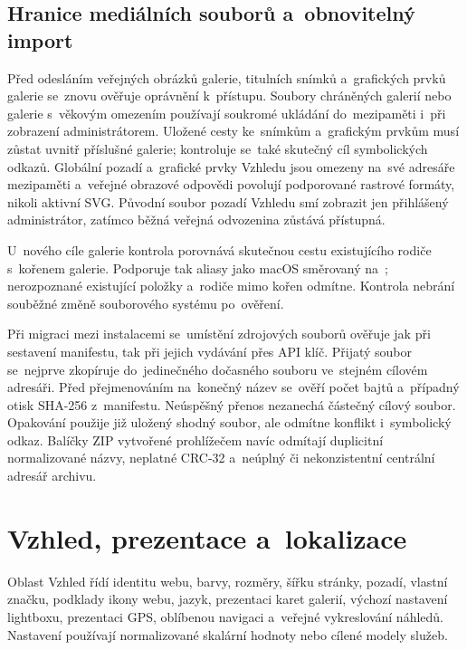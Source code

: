 \documentclass[11pt,a4paper]{article}
\newcommand{\filepath}[1]{\path{#1}}
\begin{document}
\subsection{Hranice mediálních souborů a~obnovitelný import}

Před odesláním veřejných obrázků galerie, titulních snímků a~grafických prvků
galerie se~znovu ověřuje oprávnění k~přístupu. Soubory chráněných galerií nebo
galerie s~věkovým omezením používají soukromé ukládání do~mezipaměti i~při
zobrazení administrátorem. Uložené cesty ke~snímkům a~grafickým prvkům musí
zůstat uvnitř příslušné galerie; kontroluje se~také skutečný cíl symbolických
odkazů. Globální pozadí a~grafické prvky Vzhledu jsou omezeny na~své adresáře
mezipaměti a~veřejné obrazové odpovědi povolují podporované rastrové formáty,
nikoli aktivní SVG. Původní soubor pozadí Vzhledu smí zobrazit jen přihlášený
administrátor, zatímco běžná veřejná odvozenina zůstává přístupná.

U~nového cíle galerie kontrola porovnává skutečnou cestu existujícího rodiče
s~kořenem galerie. Podporuje tak aliasy jako macOS \filepath{/var} směrovaný
na~\filepath{/private/var}; nerozpoznané existující položky a~rodiče mimo kořen
odmítne. Kontrola nebrání souběžné změně souborového systému po~ověření.

Při migraci mezi instalacemi se~umístění zdrojových souborů ověřuje jak při
sestavení manifestu, tak při jejich vydávání přes API klíč. Přijatý soubor
se~nejprve zkopíruje do~jedinečného dočasného souboru ve~stejném cílovém
adresáři. Před přejmenováním na~konečný název se~ověří počet bajtů a~případný
otisk SHA-256 z~manifestu. Neúspěšný přenos nezanechá částečný cílový soubor.
Opakování použije již uložený shodný soubor, ale odmítne konflikt i~symbolický
odkaz. Balíčky ZIP vytvořené prohlížečem navíc odmítají duplicitní normalizované
názvy, neplatné CRC-32 a~neúplný či nekonzistentní centrální adresář archivu.

\section{Vzhled, prezentace a~lokalizace}
\label{sec:theme}

Oblast Vzhled řídí identitu webu, barvy, rozměry, šířku stránky, pozadí, vlastní
značku, podklady ikony webu, jazyk, prezentaci karet galerií, výchozí nastavení
lightboxu, prezentaci GPS, oblíbenou navigaci a~veřejné vykreslování náhledů.
Nastavení používají normalizované skalární hodnoty nebo cílené modely služeb.
\end{document}
